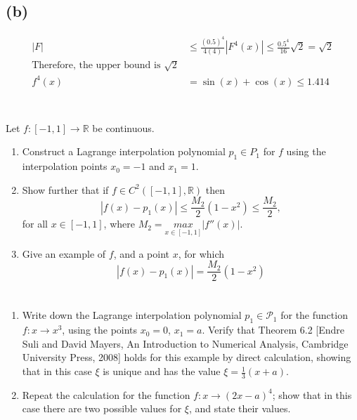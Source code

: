 \documentclass{article}
\begin{document}
\subsection*{(b)}

\begin{align*}
    |F| &\le \frac{(0.5)^4}{4(4)}|F^4(x)| \le \frac{0.5^4}{16}\sqrt{2} = \sqrt{2}\\
    \text{Therefore, the upper bound is $\sqrt{2}$}\\
    f^4(x) &= \sin(x) + \cos(x) \le 1.414\\
\end{align*}


\section{}
Let $f: [-1,1] \to \mathbb{R}$ be continuous.
\begin{enumerate}[label = (\alph*)]
    \item Construct a Lagrange interpolation polynomial $p_1 \in P_1$ for $f$ using the interpolation points $x_0 = -1$ and $x_1 = 1$.
    \item Show further that if $f \in C^2([-1,1], \mathbb{R})$ then $$|f(x)-p_1(x)| \le \frac{M_2}{2}(1-x^2) \le \frac{M_2}{2},$$
    for all $x \in [-1,1]$, where $M_2 = \underset{x \in [-1,1]}{max} |f''(x)|$.
    \item Give an example of $f$, and a point $x$, for which
    $$|f(x)-p_1(x)|= \frac{M_2}{2}(1-x^2)$$
\end{enumerate}
\vspace{10mm}


\section{}
\begin{enumerate}[label = (\alph*)]
    \item Write down the Lagrange interpolation polynomial $p_1 \in \mathcal{P}_1$ for the function $f:x \to x^3$, using the points $x_0 = 0$, $x_1 = a$. Verify that Theorem 6.2 [Endre Suli and David Mayers, An Introduction to Numerical Analysis, Cambridge University Press, 2008] holds for this example by direct calculation, showing that in this case $\xi$ is unique and has the value $\xi=\frac{1}{3}(x+a)$.
    \item Repeat the calculation for the function $f: x \to (2x-a)^4$; show that in this case there are two possible values for $\xi$, and state their values.
\end{enumerate}
\vspace{10mm}
\end{document}
